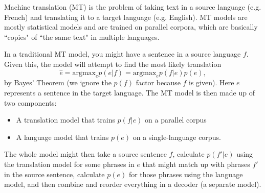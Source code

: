 Machine translation (MT) is the problem of taking text in a source language (e.g. French) and translating it to a target language (e.g. English). MT models are mostly statistical models and are trained on parallel corpora, which are basically ``copies" of ``the same text" in multiple languages.

In a traditional MT model, you might have a sentence in a source language $f$. Given this, the model will attempt to find the most likely translation
$$\hat{e} = \text{argmax}_e p(e | f) = \text{argmax}_e p(f|e)p(e),$$
by Bayes' Theorem (we ignore the $p(f)$ factor because $f$ is given). Here $e$ represents a sentence in the target language. The MT model is then made up of two components:
\begin{itemize}
\item A translation model that trains $p(f|e)$ on a parallel corpus
\item A language model that trains $p(e)$ on a single-language corpus.
\end{itemize}
The whole model might then take a source sentence $f$, calculate $p(f'|e)$ using the translation model for some phrases in $e$ that might match up with phrases $f'$ in the source sentence, calculate $p(e)$ for those phrases using the language model, and then combine and reorder everything in a decoder (a separate model).

